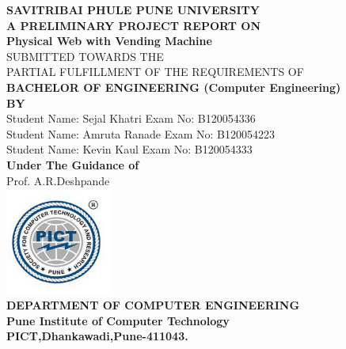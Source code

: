 \documentclass[oneside,a4paper,12pt]{report}
\begin{document}
\setlength{\parindent}{0mm}
\begin{center}
{\bfseries SAVITRIBAI PHULE PUNE UNIVERSITY \\}
 \vspace*{1\baselineskip}
{\bfseries A PRELIMINARY PROJECT REPORT ON \\}
 \vspace*{2\baselineskip}
{\bfseries \fontsize{16}{12} \selectfont Physical Web with Vending Machine \\ \vspace*{2\baselineskip}}
{\fontsize{12}{12} \selectfont SUBMITTED TOWARDS THE
 \\PARTIAL FULFILLMENT OF THE REQUIREMENTS OF \\

\vspace*{2\baselineskip}}
{\bfseries \fontsize{14}{12} \selectfont BACHELOR OF ENGINEERING (Computer
Engineering) \\
\vspace*{1\baselineskip}} 
{\bfseries \fontsize{14}{12} \selectfont BY \\ 
\vspace*{1\baselineskip}} 
Student Name: Sejal Khatri \hspace{25 mm} Exam No: B120054336\\
Student Name: Amruta Ranade \hspace{25 mm} Exam No:  B120054223  \\
Student Name: Kevin Kaul\hspace{25 mm} Exam No: B120054333  \\
\vspace*{2\baselineskip}
{\bfseries \fontsize{14}{12} \selectfont Under The Guidance of \\  
\vspace*{2\baselineskip}} 
Prof. A.R.Deshpande\\
\includegraphics[width=100pt]{collegelogo.png} \\
{\bfseries \fontsize{14}{12} \selectfont DEPARTMENT OF COMPUTER ENGINEERING \\
Pune Institute of Computer Technology \\
PICT,Dhankawadi,Pune-411043.
}
\end{center}
\end{document}
